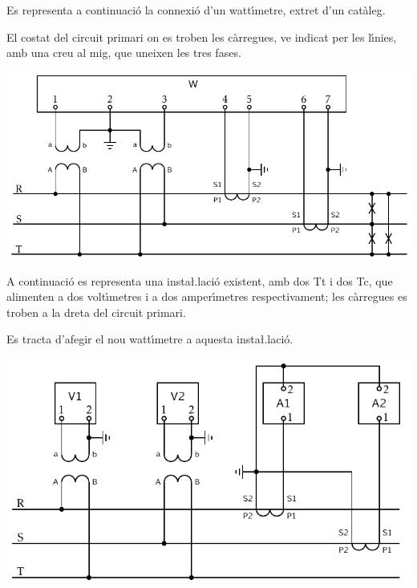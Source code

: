 \begin{exemple}
    Es representa a continuaci\'{o} la connexi\'{o} d'un watt\'{\i}metre, extret
    d'un cat\`{a}leg.

    El costat del circuit primari on es troben les c\`{a}rregues, ve indicat
    per les l\'{\i}nies, amb una creu al mig, que uneixen les tres fases.

    \begin{center}
        \includegraphics{Imatges/Cap-TrafosMesProt-Watt.pdf}
    \end{center}

    A continuaci\'{o} es representa una insta{\l.l}aci\'{o} existent, amb dos Tt i
    dos Tc, que alimenten a dos volt\'{\i}metres i a dos amper\'{\i}metres
    respectivament; les c\`{a}rregues es troben a la dreta del circuit
    primari.

    Es tracta d'afegir el nou watt\'{\i}metre a aquesta
    insta{\l.l}aci\'{o}.

    \begin{center}
        \includegraphics{Imatges/Cap-TrafosMesProt-Instal.pdf}
    \end{center}


\end{exemple}
